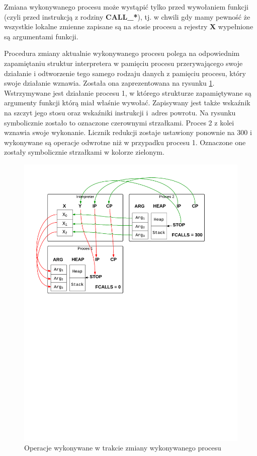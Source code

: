 Zmiana wykonywanego procesu może wystąpić tylko przed wywołaniem funkcji (czyli przed instrukcją z rodziny \textbf{CALL\_*}), tj. w chwili gdy mamy pewność że wszystkie lokalne zmienne zapisane są na stosie procesu a rejestry \textbf{X} wypełnione są argumentami funkcji.

Procedura zmiany aktualnie wykonywanego procesu polega na odpowiednim zapamiętaniu struktur interpretera w pamięciu procesu przerywającego swoje działanie i odtworzenie tego samego rodzaju danych z pamięciu procesu, który swoje działanie wznawia.
Została ona zaprezentowana na rysunku \ref{fig:preemption}.
Wstrzymywane jest działanie procesu 1, w którego strukturze zapamiętywane są argumenty funkcji którą miał właśnie wywołać.
Zapisywany jest także wskaźnik na szczyt jego stosu oraz wskaźniki instrukcji i~adres powrotu. Na rysunku symbolicznie zostało to oznaczone czerownymi strzałkami.
Proces 2 z kolei wznawia swoje wykonanie. Licznik redukcji zostaje ustawiony ponownie na 300 i wykonywane są operacje odwrotne niż w przypadku procesu 1.
Oznaczone one zostały symbolicznie strzałkami w kolorze zielonym.

\begin{figure}[h]
\centerline{\includegraphics[scale=0.8, clip, trim=10mm 145mm 30mm 10mm]{preemption}}
\caption{Operacje wykonywane w trakcie zmiany wykonywanego procesu}
\label{fig:preemption}
\end{figure}

